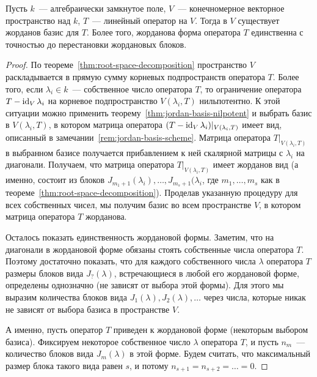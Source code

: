 \begin{theorem}\label{thm:jordan-form}
Пусть $k$~--- алгебраически замкнутое поле, $V$~--- конечномерное векторное
пространство над $k$, $T$~--- линейный оператор на $V$. Тогда
в $V$ существует жорданов базис для $T$. Более того,
жорданова форма оператора $T$ единственна с точностью до перестановки
жордановых блоков.
\end{theorem}
\begin{proof}
По теореме~\ref{thm:root-space-decomposition} пространство $V$ раскладывается
в прямую сумму корневых подпространств оператора $T$. Более того,
если $\lambda_i\in k$~--- собственное число оператора $T$, то ограничение
оператора $T-\operatorname{id}_V\lambda_i$ на корневое подпространство $V(\lambda_i,T)$
нильпотентно. К этой ситуации можно применить
теорему~\ref{thm:jordan-basis-nilpotent} и выбрать базис в
$V(\lambda_i,T)$, в котором матрица оператора
$(T-\operatorname{id}_V\lambda_i)|_{V(\lambda_i,T)}$ имеет вид, описанный
в замечании~\ref{rem:jordan-basis-scheme}.
Матрица оператора $T|_{V(\lambda_i,T)}$ в выбранном базисе
получается прибавлением к ней скалярной матрицы с $\lambda_i$ на диагонали.
Получаем, что матрица оператора $T|_{V(\lambda_i,T)}$
имеет жорданов вид (а именно, состоит из блоков
$J_{m_1+1}(\lambda_i),\dots,J_{m_s+1}(\lambda_i$, где $m_1,\dots,m_s$
как в теореме~\ref{thm:root-space-decomposition}).
Проделав указанную процедуру для всех собственных чисел, мы получим
базис во всем пространстве $V$, в котором матрица оператора $T$
жорданова.

Осталось показать единственность жордановой формы. Заметим, что
на диагонали в жордановой форме обязаны стоять собственные числа
оператора $T$. Поэтому достаточно показать, что для каждого собственного
числа $\lambda$ оператора $T$ размеры блоков вида $J_?(\lambda)$,
встречающиеся в любой его жордановой форме, определены однозначно
(не зависят от выбора этой формы).
Для этого мы выразим количества блоков вида $J_1(\lambda),J_2(\lambda),
\dots$ через числа, которые никак не зависят от выбора базиса
в пространстве $V$.

А именно, пусть оператор $T$ приведен к жордановой форме
(некоторым выбором базиса). Фиксируем некоторое
собственное число $\lambda$ оператора $T$, и
пусть $n_m$~--- количество блоков вида $J_m(\lambda)$ в этой форме.
Будем считать, что максимальный размер блока такого вида
равен $s$, и потому $n_{s+1} = n_{s+2} = \dots = 0$.


\end{proof}
